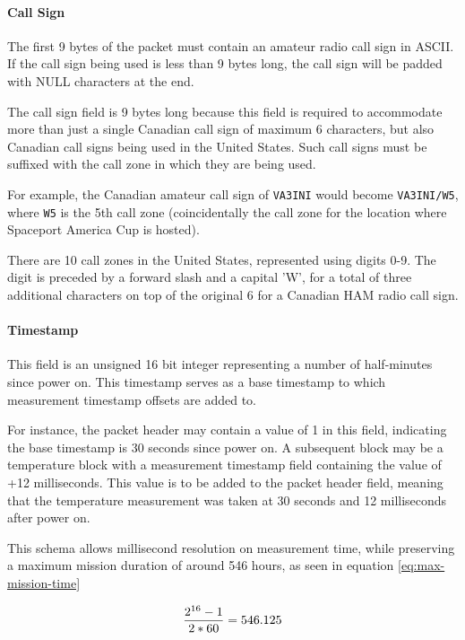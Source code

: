 \paragraph{Call Sign}

The first 9 bytes of the packet must contain an amateur radio call sign in ASCII. If the call sign being used is less
than 9 bytes long, the call sign will be padded with NULL characters at the end.

The call sign field is 9 bytes long because this field is required to accommodate more than just a single Canadian call
sign of maximum 6 characters, but also Canadian call signs being used in the United States. Such call signs must be
suffixed with the call zone in which they are being used. \cite{foreign-broadcast}

For example, the Canadian amateur call sign of \texttt{VA3INI} would become \texttt{VA3INI/W5}, where \texttt{W5} is
the 5th call zone (coincidentally the call zone for the location where Spaceport America Cup is hosted).

There are 10 call zones in the United States, represented using digits 0-9. \cite{us-callzones} The digit is preceded
by a forward slash and a capital 'W', for a total of three additional characters on top of the original 6 for a
Canadian HAM radio call sign.

\paragraph{Timestamp}

This field is an unsigned 16 bit integer representing a number of half-minutes since power on. This timestamp serves as
a base timestamp to which measurement timestamp offsets are added to.

For instance, the packet header may contain a value of 1 in this field, indicating the base timestamp is 30 seconds since
power on. A subsequent block may be a temperature block with a measurement timestamp field containing the value of +12
milliseconds. This value is to be added to the packet header field, meaning that the temperature measurement was taken
at 30 seconds and 12 milliseconds after power on.

This schema allows millisecond resolution on measurement time, while preserving a maximum mission duration of around
546 hours, as seen in equation \ref{eq:max-mission-time}

\begin{equation} \label{eq:max-mission-time}
    \frac{2^{16} - 1}{2*60} = 546.125 \\
\end{equation}

